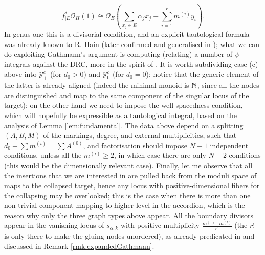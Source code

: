 \[f_{|E}^*\mathcal O_H(1)\cong\mathcal O_E\left(\sum_{x_j\in E}\alpha_jx_j-\sum_{i=1}^r m^{(i)}y_i\right).\]
In genus one this is a divisorial condition, and an explicit tautological formula was already known to R. Hain \cite{Hain} (later confirmed and generalised in \cite{JPRZ}); what we can do exploiting Gathmann's argument is computing (relating) a number of $\psi$-integrals against the DRC, more in the spirit of \cite{BSZ}. It is worth subdividing case (c) above into $\mathcal Y^c_+$ (for $d_0>0$) and $\mathcal Y^c_0$ (for $d_0=0$): notice that the generic element of the latter is already aligned (indeed the minimal monoid is $\mathbb{N}$, since all the nodes are distinguished and map to the same component of the singular locus of the target); on the other hand we need to impose the well-spacedness condition, which will hopefully be expressible as a tautological integral, based on the analysis of Lemma \ref{lem:fundamental}. The data above depend on a splitting $(A,B,M)$ of the markings, degree, and external multiplicities, such that $d_0+\sum m^{(i)}=\sum A^{(0)}$, and factorisation should impose $N-1$ independent conditions, unless all the $m^{(i)}\geq 2$, in which case there are only $N-2$ conditions (this would be the dimensionally relevant case). Finally, let me observe that all the insertions that we are interested in are pulled back from the moduli space of maps to the collapsed target, hence any locus with positive-dimensional fibers for the collapsing may be overlooked; this is the case when there is more than one non-trivial component mapping to higher level in the accordion, which is the reason why only the three graph types above appear. All the boundary divisors appear in the vanishing locus of $s_{\alpha,k}$ with positive multiplicity $\frac{m^{(1)}\cdots m^{(r)}}{r!}$ (the $r!$ is only there to make the gluing nodes unordered), as already predicated in \cite{Vre} and discussed in Remark \ref{rmk:expandedGathmann}.

